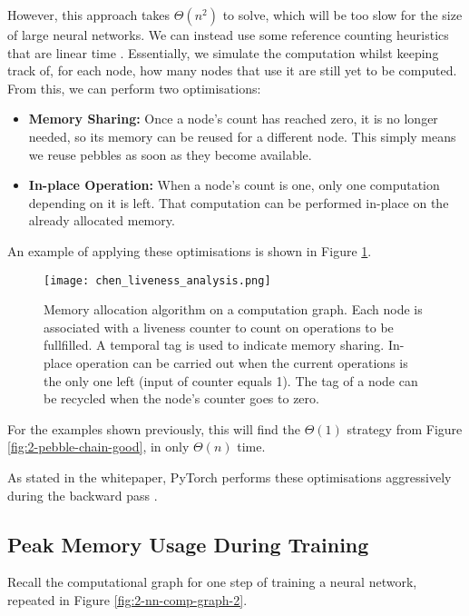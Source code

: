 However, this approach takes \(\Theta(n^2)\) to solve, which will be too slow for the size of large neural networks.
We can instead use some reference counting heuristics that are linear time \cite{Chen2016}.
Essentially, we simulate the computation whilst keeping track of, for each node, how many nodes that use it are still yet to be computed. From this, we can perform two optimisations:
\begin{itemize}[topsep=0.1em]
    \item \textbf{Memory Sharing:} Once a node's count has reached zero, it is no longer needed, so its memory can be reused for a different node.
    This simply means we reuse pebbles as soon as they become available.
    \item \textbf{In-place Operation:} When a node's count is one, only one computation depending on it is left.
    That computation can be performed in-place on the already allocated memory.
\end{itemize}
An example of applying these optimisations is shown in Figure \ref{fig:2-chen-LA}.

\begin{figure}[h]
    \centering
    \texttt{[image: chen\_liveness\_analysis.png]}
    \caption{Memory allocation algorithm on a computation graph. Each node is associated with a liveness counter to count on operations to be fullfilled. A temporal tag is used to indicate memory sharing. In-place operation can be carried out when the current operations is the only one left (input of counter equals 1). The tag of a node can be recycled when the node’s counter goes to zero. \cite[Figure~2]{Chen2016}}
    \label{fig:2-chen-LA}
\end{figure}

For the examples shown previously, this will find the \(\Theta(1)\) strategy from Figure \ref{fig:2-pebble-chain-good}, in only \(\Theta(n)\) time.

As stated in the whitepaper, PyTorch performs these optimisations aggressively during the backward pass \cite[p.~3]{Paszke2017}.

\subsection{Peak Memory Usage During Training} \label{sec:2-4-2-peak-mem-training}
Recall the computational graph for one step of training a neural network, repeated in Figure \ref{fig:2-nn-comp-graph-2}.

